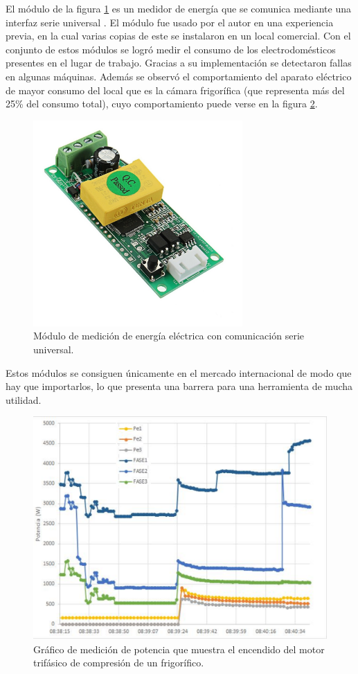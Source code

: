 El módulo de la figura \ref{fig:pzem04} es un medidor de energía que se comunica mediante una interfaz serie universal \cite{modulopezetaeme}. El módulo fue usado por el autor en una experiencia previa, en la cual varias copias de este se instalaron en un local comercial. Con el conjunto de estos módulos se logró medir el consumo de los electrodomésticos presentes en el lugar de trabajo. Gracias a su implementación se detectaron fallas en algunas máquinas. Además se observó el comportamiento del aparato eléctrico de mayor consumo del local que es la cámara frigorífica (que representa más del 25\% del consumo total), cuyo comportamiento puede verse en la figura \ref{fig:graficoW}.  

\begin{figure}[h]
	\centering
	\includegraphics[width=80mm,keepaspectratio]{Figures/pzeem004.jpg}
	\caption{Módulo de medición de energía eléctrica con comunicación serie universal\protect\footnotemark .}
	\label{fig:pzem04}
\end{figure}


Estos módulos se consiguen únicamente en el mercado internacional de modo que hay que importarlos, lo que presenta una barrera para una herramienta de mucha utilidad.

\begin{figure}[!htb]
	\centering
	\includegraphics[width=120mm,keepaspectratio]{Figures/potencia_ej.png}
	\caption{Gráfico de medición de potencia que muestra el encendido del motor trifásico de compresión de un frigorífico.}
	\label{fig:graficoW}
\end{figure}

